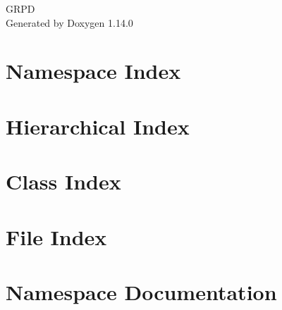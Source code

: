 \documentclass[twoside]{book}
\newcommand{\+}{\discretionary{\mbox{\scriptsize$\hookleftarrow$}}{}{}}
\newcommand{\clearemptydoublepage}{%
    \newpage{\pagestyle{empty}\cleardoublepage}%
  }
\begin{document}
  \raggedbottom
    \hypersetup{pageanchor=false,
                bookmarksnumbered=true,
                pdfencoding=unicode
               }
  \begin{titlepage}
  \vspace*{7cm}
  \begin{center}%
  {\Large GRPD}\\
  \vspace*{1cm}
  {\large Generated by Doxygen 1.14.0}\\
  \end{center}
  \end{titlepage}
  \clearemptydoublepage
  \tableofcontents
  \clearemptydoublepage
  \hypersetup{pageanchor=true}

\chapter{Namespace Index}

\chapter{Hierarchical Index}

\chapter{Class Index}

\chapter{File Index}

\chapter{Namespace Documentation}












\end{document}
